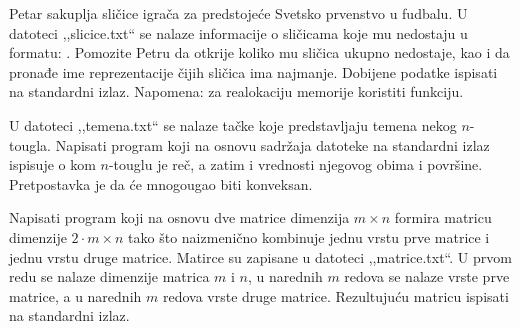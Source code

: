 
\begin{Exercise}[label=340]
Petar sakuplja sličice igrača za predstojeće Svetsko
prvenstvo u fudbalu. U datoteci ,,slicice.txt`` se nalaze
informacije o sličicama koje mu nedostaju u formatu:
. Pomozite Petru
da otkrije koliko mu sličica ukupno nedostaje, kao i da
pronađe ime reprezentacije čijih sličica ima najmanje.
Dobijene podatke ispisati na standardni izlaz. Napomena: za
realokaciju memorije koristiti  funkciju.
\end{Exercise}
\begin{Answer}[ref=340]
\end{Answer}

\begin{Exercise}[label=341]
U datoteci ,,temena.txt`` se nalaze tačke koje predstavljaju
temena nekog $n$-tougla. Napisati program koji na osnovu
sadržaja datoteke na standardni izlaz ispisuje o kom
$n$-touglu je reč, a zatim i vrednosti njegovog obima i
površine. Pretpostavka je da će mnogougao biti konveksan.
\end{Exercise}
\begin{Answer}[ref=341]
\end{Answer}

\begin{Exercise}[label=342]
Napisati program koji na osnovu dve matrice dimenzija $m \times n$
formira matricu dimenzije $2 \cdot m \times n$ tako što
naizmenično kombinuje jednu vrstu prve matrice i jednu vrstu
druge matrice. Matirce su zapisane u datoteci ,,matrice.txt``. U
prvom redu se nalaze dimenzije matrica $m$ i $n$, u
narednih $m$ redova se nalaze vrste prve matrice, a u
narednih $m$ redova vrste druge matrice. Rezultujuću
matricu ispisati na standardni izlaz.
\end{Exercise}
\begin{Answer}[ref=342]
\end{Answer}

